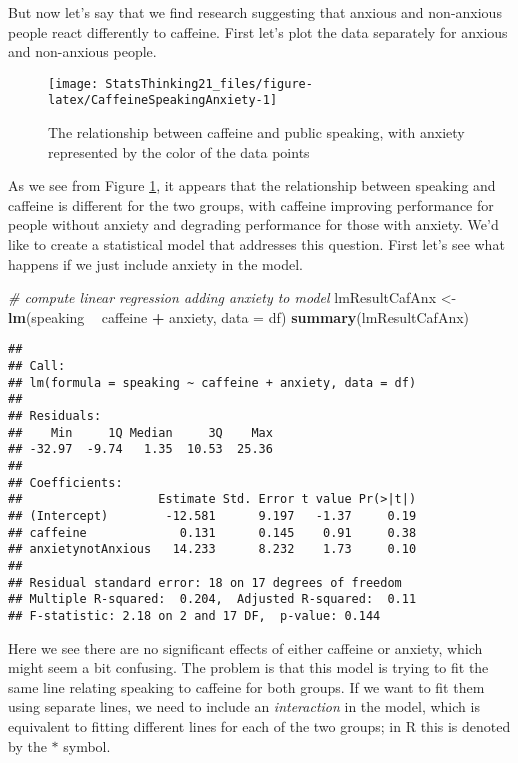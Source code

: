 \documentclass[]{book}
\newenvironment{Shaded}{\begin{snugshade}}{\end{snugshade}}
\newcommand{\KeywordTok}[1]{\textcolor[rgb]{0.13,0.29,0.53}{\textbf{#1}}}
\newcommand{\DataTypeTok}[1]{\textcolor[rgb]{0.13,0.29,0.53}{#1}}
\newcommand{\StringTok}[1]{\textcolor[rgb]{0.31,0.60,0.02}{#1}}
\newcommand{\CommentTok}[1]{\textcolor[rgb]{0.56,0.35,0.01}{\textit{#1}}}
\newcommand{\OperatorTok}[1]{\textcolor[rgb]{0.81,0.36,0.00}{\textbf{#1}}}
\newcommand{\NormalTok}[1]{#1}
\theoremstyle{definition}
\theoremstyle{definition}
\theoremstyle{definition}
\theoremstyle{remark}
\begin{document}
But now let's say that we find research suggesting that anxious and
non-anxious people react differently to caffeine. First let's plot the
data separately for anxious and non-anxious people.

\begin{figure}
\texttt{[image: StatsThinking21\_files/figure-latex/CaffeineSpeakingAnxiety-1]} \caption{The relationship between caffeine and public speaking, with anxiety represented by the color of the data points}\label{fig:CaffeineSpeakingAnxiety}
\end{figure}

As we see from Figure \ref{fig:CaffeineSpeakingAnxiety}, it appears that
the relationship between speaking and caffeine is different for the two
groups, with caffeine improving performance for people without anxiety
and degrading performance for those with anxiety. We'd like to create a
statistical model that addresses this question. First let's see what
happens if we just include anxiety in the model.

\begin{Shaded}
\begin{Highlighting}[]
\CommentTok{# compute linear regression adding anxiety to model}
\NormalTok{lmResultCafAnx <-}\StringTok{ }\KeywordTok{lm}\NormalTok{(speaking }\OperatorTok{~}\StringTok{ }\NormalTok{caffeine }\OperatorTok{+}\StringTok{ }\NormalTok{anxiety, }\DataTypeTok{data =}\NormalTok{ df)}
\KeywordTok{summary}\NormalTok{(lmResultCafAnx)}
\end{Highlighting}
\end{Shaded}

\begin{verbatim}
## 
## Call:
## lm(formula = speaking ~ caffeine + anxiety, data = df)
## 
## Residuals:
##    Min     1Q Median     3Q    Max 
## -32.97  -9.74   1.35  10.53  25.36 
## 
## Coefficients:
##                   Estimate Std. Error t value Pr(>|t|)
## (Intercept)        -12.581      9.197   -1.37     0.19
## caffeine             0.131      0.145    0.91     0.38
## anxietynotAnxious   14.233      8.232    1.73     0.10
## 
## Residual standard error: 18 on 17 degrees of freedom
## Multiple R-squared:  0.204,  Adjusted R-squared:  0.11 
## F-statistic: 2.18 on 2 and 17 DF,  p-value: 0.144
\end{verbatim}

Here we see there are no significant effects of either caffeine or
anxiety, which might seem a bit confusing. The problem is that this
model is trying to fit the same line relating speaking to caffeine for
both groups. If we want to fit them using separate lines, we need to
include an \emph{interaction} in the model, which is equivalent to
fitting different lines for each of the two groups; in R this is denoted
by the \(*\) symbol.
\end{document}
